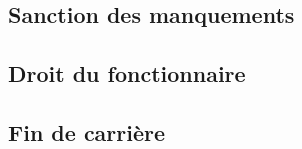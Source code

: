 \documentclass[a4paper,12pt]{article}
\begin{document}
\subsection{Sanction des manquements}
\subsection{Droit du fonctionnaire}
\subsection{Fin de carrière}


%

%
%

\newpage
\nocite{*}  %


%
%
%
%
\end{document}
